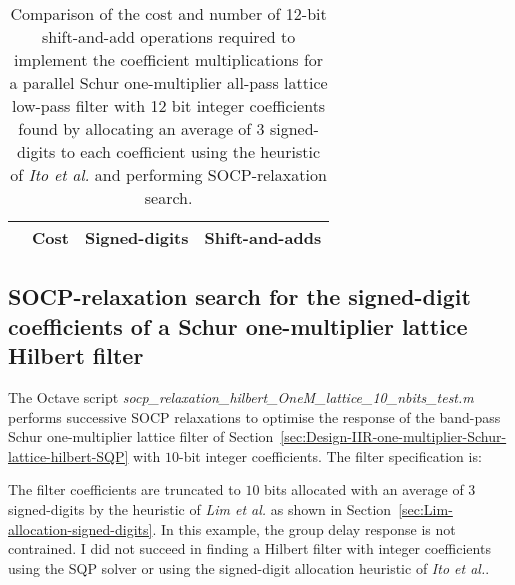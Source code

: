 \documentclass[a4paper,twoside,10pt,english]{report}
\begin{document}
\begin{table}[htb]
\centering
\begin{threeparttable}
\begin{tabular}{lccc}  \\ \toprule
& Cost&Signed-digits&Shift-and-adds\\ \midrule

\bottomrule
\end{tabular}
\end{threeparttable}
\caption[Summary of cost results for the parallel Schur one-multiplier
all-pass lattice lowpass filter SOCP algorithm example with 12 bit
coefficients] {Comparison of the cost and number of 12-bit shift-and-add
  operations required to implement the coefficient multiplications for a
  parallel Schur one-multiplier all-pass lattice low-pass filter with 12 bit
  integer coefficients found by allocating an average of 3 signed-digits to
  each coefficient using the heuristic of \emph{Ito et al.} and performing
  SOCP-relaxation search.}
\label{tab:socp-relax-schurOneMPAlattice-lowpass-12-nbits-cost-summary}
\end{table}
\clearpage
\subsection{\label{sec:SOCP-relaxation-search-signed-digit-coefficients-hilbert}SOCP-relaxation search for the signed-digit coefficients of a Schur one-multiplier lattice Hilbert filter}
The Octave script 
\emph{socp\_relaxation\_hilbert\_OneM\_lattice\_10\_nbits\_test.m} performs
successive SOCP relaxations to optimise the response of the band-pass Schur
one-multiplier lattice filter of
Section~\ref{sec:Design-IIR-one-multiplier-Schur-lattice-hilbert-SQP} with
$10$-bit integer coefficients. The filter specification is:
\begin{small}

\end{small} 
The filter coefficients are truncated to $10$ bits allocated with an average
of $3$ signed-digits by the heuristic of \emph{Lim et al.} as shown in
Section~\ref{sec:Lim-allocation-signed-digits}. In this example, the group
delay response is not contrained. I did not succeed in finding a Hilbert
filter with integer coefficients using the SQP solver or using the
signed-digit allocation heuristic of \emph{Ito et al.}.
\end{document}

